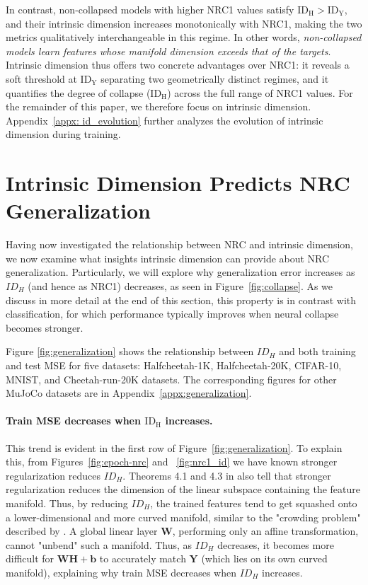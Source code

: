 \documentclass{article}
\newcommand{\bW}{{\mathbf W}}
\newcommand{\bY}{{\mathbf Y}}
\newcommand{\bH}{{\mathbf H}}
\newcommand{\bb}{{\mathbf b}}
\newcommand{\idh}{\ensuremath{\mathrm{ID}_{\mathrm{H}}}}
\newcommand{\idy}{\ensuremath{\mathrm{ID}_{\mathrm{Y}}}}
\theoremstyle{plain}
\theoremstyle{definition}
\theoremstyle{remark}
\begin{document}
In contrast, non-collapsed models with higher NRC1 values satisfy $\idh > \idy$, and their intrinsic dimension increases monotonically with NRC1, making the two metrics qualitatively interchangeable in this regime. In other words, \emph{non-collapsed models learn features whose manifold dimension exceeds that of the targets}. Intrinsic dimension thus offers two concrete advantages over NRC1: it reveals a soft threshold at $\idy$ separating two geometrically distinct regimes, and it quantifies the degree of collapse ($\idh$) across the full range of NRC1 values. For the remainder of this paper, we therefore focus on intrinsic dimension. Appendix~\ref{appx: id_evolution} further analyzes the evolution of intrinsic dimension during training.


\section{Intrinsic Dimension Predicts NRC Generalization} \label{sec:generalization}

Having now investigated the relationship between NRC and intrinsic dimension, we now examine what insights intrinsic dimension can provide about NRC generalization. Particularly, we will explore why generalization error increases as $ID_H$ (and hence as NRC1) decreases, as seen in Figure~\ref{fig:collapse}. As we discuss in more detail at the end of this section, this property is in contrast with classification, for which performance typically improves when neural collapse becomes stronger.

Figure \ref{fig:generalization} shows the relationship between $ID_H$ and both training and test MSE for five datasets: Halfcheetah-1K, Halfcheetah-20K, CIFAR-10, MNIST, and Cheetah-run-20K datasets. The corresponding figures for other MuJoCo datasets are in Appendix~\ref{appx:generalization}.

\paragraph{Train MSE decreases when \(\mathbf{\idh}\) increases.} This trend is evident in the first row of Figure~\ref{fig:generalization}. To explain this, from Figures~\ref{fig:epoch-nrc} and ~\ref{fig:nrc1_id} we have known stronger regularization reduces $ID_H$. Theorems 4.1 and 4.3 in \citet{andriopoulos2024prevalence} also tell that stronger regularization reduces the dimension of the linear subspace containing the feature manifold. Thus, by reducing $ID_H$, the trained features tend to get squashed onto a lower-dimensional and more curved manifold, similar to the "crowding problem" described by \citet{maaten2008tsne}. A global linear layer $\bW$, performing only an affine transformation, cannot "unbend" such a manifold. Thus, as $ID_H$ decreases, it becomes more difficult for $\bW \bH +\bb$ to accurately match $\bY$ (which lies on its own curved manifold), explaining why train MSE decreases when $ID_H$ increases.
\end{document}
